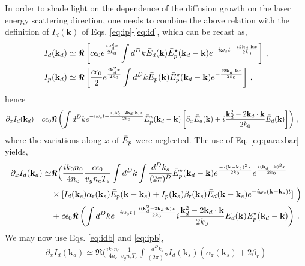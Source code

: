 \documentclass[
 reprint,
 amsmath,amssymb,
 aps,
]{revtex4-1}
\begin{document}
\begin{widetext}
In order to shade light on the dependence of the diffusion growth on the laser energy scattering direction, one needs to combine the above relation with the definition of $I_d(\mathbf{k})$ of  Eqs. \eqref{eq:ip}-\eqref{eq:id}, which can be recast as,
\begin{align}
I_d(\mathbf{k}_d) &\simeq  \Re\left[  c\epsilon_0e^{\frac{ i\mathbf{k}_d^2x}{2k_0}}  \int d^Dk \Bar{E}_d(\mathbf{k}) \Bar{E}_p^\star(\mathbf{k}_d-\mathbf{k})e^{-i\omega_s t -\frac{i2\mathbf{k}_d\cdot \mathbf{k}x}{2k_0}}\right]  \, , \label{eq:idb} \\
I_p(\mathbf{k}_d) &\simeq  \Re\left[  \frac{c\epsilon_0}{2}e^{\frac{ i\mathbf{k}_d^2x}{2k_0}}  \int d^Dk \Bar{E}_p(\mathbf{k}) \Bar{E}_p^\star(\mathbf{k}_d-\mathbf{k})e^{ -\frac{i2\mathbf{k}_d\cdot \mathbf{k}x}{2k_0}}\right]  \, , \label{eq:ipb}
\end{align}
hence
\begin{align}
\partial_xI_d(\mathbf{k}_d)=  &  c\epsilon_0  \Re\left( \int d^Dk e^{-i\omega_st+ \frac{i( \mathbf{k}_d^2-2\mathbf{k}_d\cdot \mathbf{k} )x}{2k_0}} \Bar{E}_p^\star(\mathbf{k}_d-\mathbf{k} )
\left[\partial_x \Bar{E}_d (\mathbf{k}  ) 
+i\frac{  \mathbf{k}_d^2-2\mathbf{k}_d\cdot \mathbf{k}}{2k_0} \Bar{E}_d(\mathbf{k})
\right]  \right)\, , \label{eq:idbdz}
\end{align}
where the variations along $x$ of $\Bar{E}_p$ were neglected. 
The  use of Eq. \eqref{eq:paraxbar} yields, 
\begin{align}
\partial_xI_d(\mathbf{k}_d)\simeq &\Re\Big( \frac{ik_0n_0}{4n_c} \frac{c\epsilon_0 }{  v_g n_c T_e}   \int d^Dk \int \frac{d^Dk_s}{(2\pi)^D} \Bar{E}_p^\star(\mathbf{k}_d-\mathbf{k})
e^{\frac{-i(\mathbf{k}-\mathbf{k}_s)^2x}{2k_0} }
e^{\frac{i(\mathbf{k}_d-\mathbf{k})^2x}{2k_0} } \nonumber \\
&\times [I_d(\mathbf{k}_s) \alpha_\mathrm{r}(\mathbf{k}_s) 
\Bar{E}_p(\mathbf{k}-\mathbf{k}_s) 
+I_p(\mathbf{k}_s) \beta_\mathrm{r}(\mathbf{k}_s) 
\Bar{E}_d(\mathbf{k}-\mathbf{k}_s) e^{-i\omega_s(\mathbf{k}-\mathbf{k}_s)t}
] \
 \Big) \nonumber\\
& +c\epsilon_0  \Re\left( \int d^Dk e^{-i\omega_s t+\frac{ i( \mathbf{k}_d^2-2\mathbf{k}_d\cdot \mathbf{k} )x}{2k_0}} 
i\frac{  \mathbf{k}_d^2-2\mathbf{k}_d\cdot \mathbf{k}}{2k_0} \Bar{E}_d(\mathbf{k})\Bar{E}_p^\star(\mathbf{k}_d-\mathbf{k} )
  \right)
\, . \label{eq:g1}
\end{align}
We may now use Eqs. \eqref{eq:idb} and  \eqref{eq:ipb}, 
\begin{align}
\partial_xI_d(\mathbf{k}_d)\simeq \Re\Big( \frac{ik_0n_0}{4n_c} \frac{1 }{  v_g n_c T_e}    \int \frac{d^Dk_s}{(2\pi)^D} I_d(\mathbf{k}_s) (\alpha_\mathrm{r}(\mathbf{k}_s) +2\beta_r)

\end{align}
\end{widetext}
\end{document}
